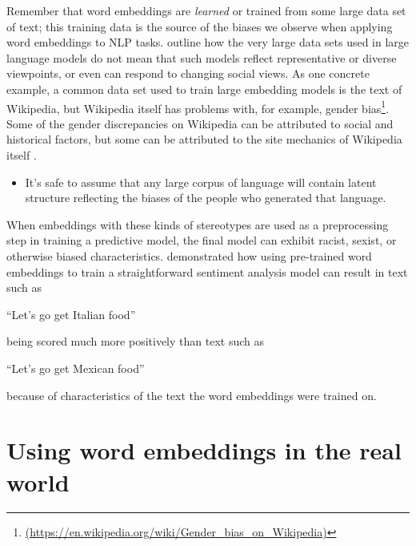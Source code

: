 \documentclass[
]{krantz}
\DeclareRobustCommand{\href}[2]{#2\footnote{\url{#1}}}
\renewenvironment{quote}{\begin{VF}}{\end{VF}}
\renewcommand{\href}[2]{#2\footnote{\url{#1}}}
\newenvironment{rmdblock}[1]
  {\begin{shaded*}
  \begin{itemize}[left = -1cm, labelsep = 1cm]
  \renewcommand{\labelitemi}{
    \raisebox{-.7\height}[0pt][0pt]{
      {\setkeys{Gin}{width=3em,keepaspectratio}\texttt{[image: images/\#1]}}
    }
  }
 
  \item
  }
  {
  \end{itemize}
  \end{shaded*}
  }
\newenvironment{rmdnote}
  {\begin{rmdblock}{note}}
  {\end{rmdblock}}
\begin{document}
Remember that word embeddings are \emph{learned} or trained from some large data set of text; this training data is the source of the biases we observe when applying word embeddings to NLP tasks. \citet{Bender2021} outline how the very large data sets used in large language models do not mean that such models reflect representative or diverse viewpoints, or even can respond to changing social views. As one concrete example, a common data set used to train large embedding models is the text of Wikipedia, but Wikipedia \href{(https://en.wikipedia.org/wiki/Gender_bias_on_Wikipedia)}{itself has problems with, for example, gender bias}. Some of the gender discrepancies on Wikipedia can be attributed to social and historical factors, but some can be attributed to the site mechanics of Wikipedia itself \citep{Wagner2016}.

\begin{rmdnote}
It's safe to assume that any large corpus of language will contain
latent structure reflecting the biases of the people who generated that
language.
\end{rmdnote}


When embeddings with these kinds of stereotypes are used as a preprocessing step in training a predictive model, the final model can exhibit racist, sexist, or otherwise biased characteristics. \citet{Speer2017} demonstrated how using pre-trained word embeddings to train a straightforward sentiment analysis model can result in text such as

\begin{quote}
``Let's go get Italian food''
\end{quote}

being scored much more positively than text such as

\begin{quote}
``Let's go get Mexican food''
\end{quote}

because of characteristics of the text the word embeddings were trained on.

\hypertarget{using-word-embeddings-in-the-real-world}{%
\section{Using word embeddings in the real world}\label{using-word-embeddings-in-the-real-world}}
\end{document}
